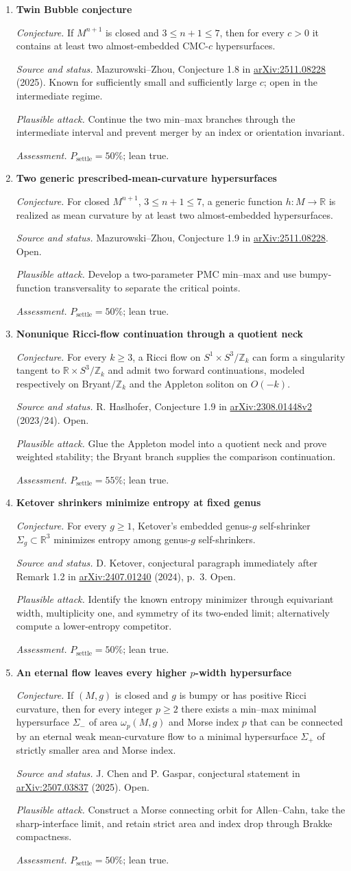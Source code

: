 \documentclass[11pt]{article}
\newcommand{\cand}[5]{%
  \item \textbf{#1}\par
  \emph{Conjecture.} #2\par
  \emph{Source and status.} #3\par
  \emph{Plausible attack.} #4\par
  \emph{Assessment.} #5
}
\newcommand{\psettle}{P_{\mathrm{settle}}}
\begin{document}
\begin{enumerate}[label=\textbf{M\arabic*.}]

\cand{Twin Bubble conjecture}
{If $M^{n+1}$ is closed and $3\le n+1\le7$, then for every $c>0$ it contains at least two almost-embedded CMC-$c$ hypersurfaces.}
{Mazurowski--Zhou, Conjecture 1.8 in \href{https://arxiv.org/abs/2511.08228}{arXiv:2511.08228} (2025).  Known for sufficiently small and sufficiently large $c$; open in the intermediate regime.}
{Continue the two min--max branches through the intermediate interval and prevent merger by an index or orientation invariant.}
{$\psettle=50\%$; lean true.}

\cand{Two generic prescribed-mean-curvature hypersurfaces}
{For closed $M^{n+1}$, $3\le n+1\le7$, a generic function $h:M\to\mathbb R$ is realized as mean curvature by at least two almost-embedded hypersurfaces.}
{Mazurowski--Zhou, Conjecture 1.9 in \href{https://arxiv.org/abs/2511.08228}{arXiv:2511.08228}.  Open.}
{Develop a two-parameter PMC min--max and use bumpy-function transversality to separate the critical points.}
{$\psettle=50\%$; lean true.}

\cand{Nonunique Ricci-flow continuation through a quotient neck}
{For every $k\ge3$, a Ricci flow on $S^1\times S^3/\mathbb Z_k$ can form a singularity tangent to $\mathbb R\times S^3/\mathbb Z_k$ and admit two forward continuations, modeled respectively on Bryant$/\mathbb Z_k$ and the Appleton soliton on $O(-k)$.}
{R. Haslhofer, Conjecture 1.9 in \href{https://arxiv.org/abs/2308.01448}{arXiv:2308.01448v2} (2023/24).  Open.}
{Glue the Appleton model into a quotient neck and prove weighted stability; the Bryant branch supplies the comparison continuation.}
{$\psettle=55\%$; lean true.}

\cand{Ketover shrinkers minimize entropy at fixed genus}
{For every $g\ge1$, Ketover's embedded genus-$g$ self-shrinker $\Sigma_g\subset\mathbb R^3$ minimizes entropy among genus-$g$ self-shrinkers.}
{D. Ketover, conjectural paragraph immediately after Remark 1.2 in \href{https://arxiv.org/abs/2407.01240}{arXiv:2407.01240} (2024), p.~3.  Open.}
{Identify the known entropy minimizer through equivariant width, multiplicity one, and symmetry of its two-ended limit; alternatively compute a lower-entropy competitor.}
{$\psettle=50\%$; lean true.}

\cand{An eternal flow leaves every higher $p$-width hypersurface}
{If $(M,g)$ is closed and $g$ is bumpy or has positive Ricci curvature, then for every integer $p\ge2$ there exists a min--max minimal hypersurface $\Sigma_-$ of area $\omega_p(M,g)$ and Morse index $p$ that can be connected by an eternal weak mean-curvature flow to a minimal hypersurface $\Sigma_+$ of strictly smaller area and Morse index.}
{J. Chen and P. Gaspar, conjectural statement in \href{https://arxiv.org/abs/2507.03837}{arXiv:2507.03837} (2025).  Open.}
{Construct a Morse connecting orbit for Allen--Cahn, take the sharp-interface limit, and retain strict area and index drop through Brakke compactness.}
{$\psettle=50\%$; lean true.}


\end{enumerate}
\end{document}
